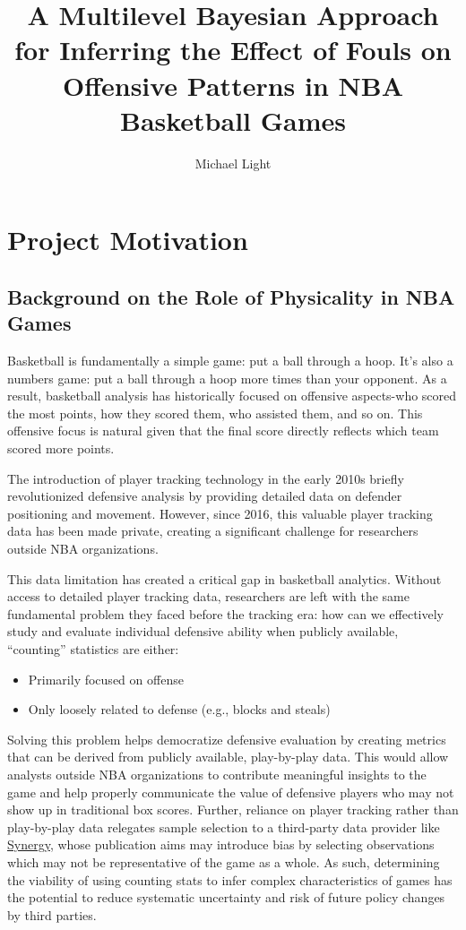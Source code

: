 \documentclass[
  letterpaper,
  DIV=11,
  numbers=noendperiod]{scrartcl}
\title{A Multilevel Bayesian Approach for Inferring the Effect of Fouls
on Offensive Patterns in NBA Basketball Games}
\author{Michael Light}
\date{}
\begin{document}
\maketitle

\section{Project Motivation}\label{project-motivation}

\subsection{Background on the Role of Physicality in NBA
Games}\label{background-on-the-role-of-physicality-in-nba-games}

Basketball is fundamentally a simple game: put a ball through a hoop.
It's also a numbers game: put a ball through a hoop more times than your
opponent. As a result, basketball analysis has historically focused on
offensive aspects-who scored the most points, how they scored them, who
assisted them, and so on. This offensive focus is natural given that the
final score directly reflects which team scored more points.

The introduction of player tracking technology in the early 2010s
briefly revolutionized defensive analysis by providing detailed data on
defender positioning and movement. However, since 2016, this valuable
player tracking data has been made private, creating a significant
challenge for researchers outside NBA organizations.

This data limitation has created a critical gap in basketball analytics.
Without access to detailed player tracking data, researchers are left
with the same fundamental problem they faced before the tracking era:
how can we effectively study and evaluate individual defensive ability
when publicly available, ``counting'' statistics are either:

\begin{itemize}
\item
  Primarily focused on offense
\item
  Only loosely related to defense (e.g., blocks and steals)
\end{itemize}

Solving this problem helps democratize defensive evaluation by creating
metrics that can be derived from publicly available, play-by-play data.
This would allow analysts outside NBA organizations to contribute
meaningful insights to the game and help properly communicate the value
of defensive players who may not show up in traditional box scores.
Further, reliance on player tracking rather than play-by-play data
relegates sample selection to a third-party data provider like
\href{https://sportradar.com/synergy-player-tracking/}{Synergy}, whose
publication aims may introduce bias by selecting observations which may
not be representative of the game as a whole. As such, determining the
viability of using counting stats to infer complex characteristics of
games has the potential to reduce systematic uncertainty and risk of
future policy changes by third parties.
\end{document}
